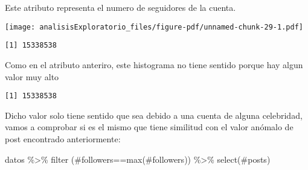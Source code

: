 \documentclass[
  letterpaper,
  DIV=11,
  numbers=noendperiod]{scrreprt}
\newenvironment{Shaded}{\begin{snugshade}}{\end{snugshade}}
\newcommand{\AttributeTok}[1]{\textcolor[rgb]{0.40,0.45,0.13}{#1}}
\newcommand{\FunctionTok}[1]{\textcolor[rgb]{0.28,0.35,0.67}{#1}}
\newcommand{\NormalTok}[1]{\textcolor[rgb]{0.00,0.23,0.31}{#1}}
\newcommand{\SpecialCharTok}[1]{\textcolor[rgb]{0.37,0.37,0.37}{#1}}
\newcommand{\StringTok}[1]{\textcolor[rgb]{0.13,0.47,0.30}{#1}}
\begin{document}
Este atributo representa el numero de seguidores de la cuenta.

\begin{Shaded}
\end{Shaded}

\texttt{[image: analisisExploratorio\_files/figure-pdf/unnamed-chunk-29-1.pdf]}

\begin{Shaded}
\end{Shaded}

\begin{verbatim}
[1] 15338538
\end{verbatim}

Como en el atributo anteriro, este histograma no tiene sentido porque
hay algun valor muy alto

\begin{Shaded}
\end{Shaded}

\begin{verbatim}
[1] 15338538
\end{verbatim}

Dicho valor solo tiene sentido que sea debido a una cuenta de alguna
celebridad, vamos a comprobar si es el mismo que tiene similitud con el
valor anómalo de post encontrado anteriormente:

\begin{Shaded}
\begin{Highlighting}[]
\NormalTok{datos }\SpecialCharTok{\%\textgreater{}\%} \FunctionTok{filter}\NormalTok{ (}\StringTok{\textasciigrave{}}\AttributeTok{\#followers}\StringTok{\textasciigrave{}}\SpecialCharTok{==}\FunctionTok{max}\NormalTok{(}\StringTok{\textasciigrave{}}\AttributeTok{\#followers}\StringTok{\textasciigrave{}}\NormalTok{)) }\SpecialCharTok{\%\textgreater{}\%} \FunctionTok{select}\NormalTok{(}\StringTok{\textasciigrave{}}\AttributeTok{\#posts}\StringTok{\textasciigrave{}}\NormalTok{)}
\end{Highlighting}
\end{Shaded}
\end{document}
